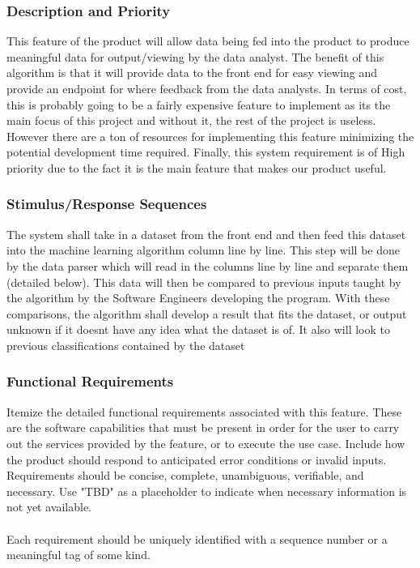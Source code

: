 \documentclass[12pt,oneside,letterpaper]{article}
\begin{document}
\subsubsection{Description and Priority}
This feature of the product will allow data being fed into the product to produce meaningful data for output/viewing by the data analyst. The benefit of this algorithm is that it will provide data to the front end for easy viewing and provide an endpoint for where feedback from the data analysts. In terms of cost, this is probably going to be a fairly expensive feature to implement as its the main focus of this project and without it, the rest of the project is useless. However there are a ton of resources for implementing this feature minimizing the potential development time required. Finally, this system requirement is of High priority due to the fact it is the main feature that makes our product useful. 
\subsubsection{Stimulus/Response Sequences}
The system shall take in a dataset from the front end and then feed this dataset into the machine learning algorithm column line by line. This step will be done by the data parser which will read in the columns line by line and separate them (detailed below). This data will then be compared to previous inputs taught by the algorithm by the Software Engineers developing the program. With these comparisons, the algorithm shall develop a result that fits the dataset, or output unknown if it doesnt have any idea what the dataset is of. It also will look to previous classifications contained by the dataset 
\subsubsection{Functional Requirements}
Itemize the detailed functional requirements associated with this feature. These are the software capabilities that must be present in order for the user to carry out the services provided by the feature, or to execute the use case. Include how the product should respond to anticipated error conditions or invalid inputs. Requirements should be concise, complete, unambiguous, verifiable, and necessary. Use "TBD" as a placeholder to indicate when necessary information is not yet available.\\
\\
Each requirement should be uniquely identified with a sequence number or a meaningful tag of some kind.
\end{document}

